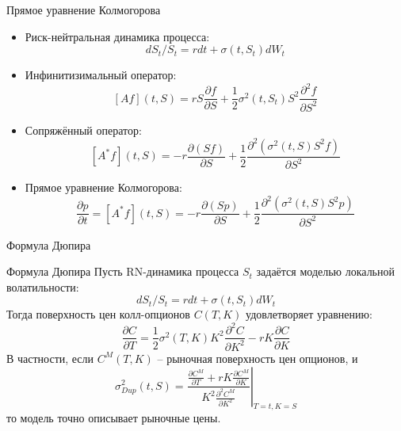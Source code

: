 \documentclass[aspectratio=169]{beamer}
\begin{document}
\begin{frame}{Прямое уравнение Колмогорова}
    \begin{itemize}
        \item Риск-нейтральная динамика процесса: 
        $$
            dS_t/S_t = r dt + \sigma(t, S_t) dW_t
        $$

        \item Инфинитизимальный оператор:
        $$
            [Af](t, S) = r S \dfrac{\partial f}{\partial S}
            + \dfrac{1}{2}\sigma^2(t, S_t)S^2 \dfrac{\partial^2 f}{\partial S^2}
        $$

        \item Сопряжённый оператор:
        $$
            [A^*f](t, S) = -r \dfrac{\partial (S f)}{\partial S}
            + \dfrac{1}{2} \dfrac{\partial^2 (\sigma^2(t, S) S^2 f)}{\partial S^2}
        $$

        \item Прямое уравнение Колмогорова:
        $$
            \dfrac{\partial p}{\partial t} = [A^*f](t, S)
            = -r \dfrac{\partial (S p)}{\partial S}
            + \dfrac{1}{2} \dfrac{\partial^2 (\sigma^2(t, S) S^2 p)}{\partial S^2}
        $$
    \end{itemize}
\end{frame}

\begin{frame}{Формула Дюпира}

    \begin{block}{Формула Дюпира}
        Пусть RN-динамика процесса $S_t$ задаётся моделью локальной волатильности:
        $$
            dS_t / S_t = r dt + \sigma(t, S_t) dW_t
        $$
        Тогда поверхность цен колл-опционов $C(T, K)$ удовлетворяет уравнению: 
        $$
            \dfrac{\partial C}{\partial T} = \dfrac{1}{2} \sigma^2(T, K) K^2 
            \dfrac{\partial^2 C}{\partial K^2} - r K \dfrac{\partial C}{\partial K}
        $$
        В частности, если $C^M(T, K)$ -- рыночная поверхность цен опционов, и
        $$
            \sigma^2_{Dup}(t, S) = \left.\dfrac{\frac{\partial C^M}{\partial T} + r K \frac{\partial C^M}{\partial K}}
            {K^2 \frac{\partial^2 C^M}{\partial K^2}} \right\vert_{T=t, K=S}
        $$то модель точно описывает рыночные цены.
    \end{block}
\end{frame}
\end{document}
